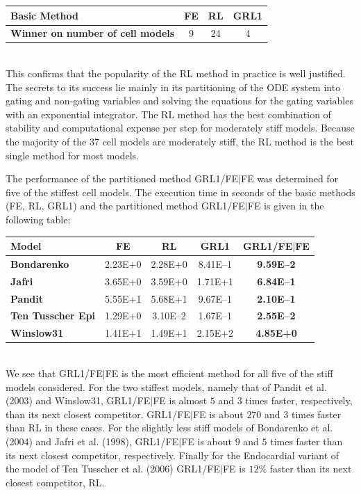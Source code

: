 \documentclass[landscape,a0b,final]{a0poster}
\newenvironment{poster}{
  \begin{center}
  \begin{minipage}[c]{0.98\textwidth}
}{
  \end{minipage} 
  \end{center}
}
\newenvironment{pcolumn}[1]{
  \begin{minipage}{#1\textwidth}
  \begin{center}
}{
  \end{center}
  \end{minipage}
}
\begin{document}
\begin{poster}
\begin{center}
\begin{pcolumn}{0.24}
{\vspace{0.5 cm}
\begin{tabular}{|l| c | c | c |}
  \hline
   \bf{Basic Method}  & \bf{FE}  & \bf{RL} & \bf{GRL1} \\
\hline
 \bf{Winner on number of cell models} &  9 &  24  & 4 \\ 
\hline
\end{tabular}
\vspace{0.5 cm}
\\This confirms that
the popularity of the RL method in practice is well justified. The
secrets to its success lie mainly in its partitioning of the ODE
system into gating and non-gating variables and solving the equations
for the gating variables with an exponential integrator. The RL method
has the best combination of stability and computational expense per
step for moderately stiff models. Because the majority of the 37 cell
models are moderately stiff, the RL method is the best single method
for most models.

The performance of the partitioned method GRL1/FE$|$FE was determined
for five of the stiffest cell models. The execution time in seconds
of the basic methods (FE, RL, GRL1) and the partitioned method
GRL1/FE$|$FE is given in the following table:

\vspace{0.5 cm}
\begin{tabular}{|l| c | c | c | c |}
  \hline
   \bf{Model}  & \bf{FE}  & \bf{RL} & \bf{GRL1}  & \bf{GRL1/FE$|$FE} \\
\hline
 \bf{Bondarenko} &  2.23E+0 &  2.28E+0  & 8.41E--1   & \bf{9.59E--2}\\ 
\hline
 \bf{Jafri}  &  3.65E+0  & 3.59E+0 & 1.71E+1  & \bf{6.84E--1}  \\     
\hline
 \bf{Pandit}  &  5.55E+1 & 5.68E+1 &  9.67E--1  & \bf{2.10E--1}  \\ 
\hline
 \bf{Ten Tusscher Epi} &   1.29E+0 &  3.10E--2 & 1.67E--1   & \bf{2.55E--2}  \\  
\hline
 \bf{Winslow31} &  1.41E+1  &  1.49E+1 &  2.15E+2   & \bf{4.85E+0}  \\ 
\hline
\end{tabular}
\vspace{0.5 cm}
\\We see that GRL1/FE$|$FE is the most efficient method for all five of 
the stiff models considered. For the two stiffest models, namely that 
of Pandit et al. (2003) and Winslow31, GRL1/FE$|$FE is almost $5$ 
and $3$ times faster, respectively, than its next closest competitor.
GRL1/FE$|$FE is about $270$ and $3$ times faster than RL in these cases.
For the slightly less stiff models of Bondarenko et al. (2004) and
Jafri et al. (1998), GRL1/FE$|$FE is about $9$ and $5$
times faster than its next closest competitor, respectively. Finally 
for the Endocardial variant of the model of Ten Tusscher et al. (2006)
GRL1/FE$|$FE is $12$\% faster than its next closest competitor, RL. 

}
\end{pcolumn}
\end{center}
\end{poster}
\end{document}
